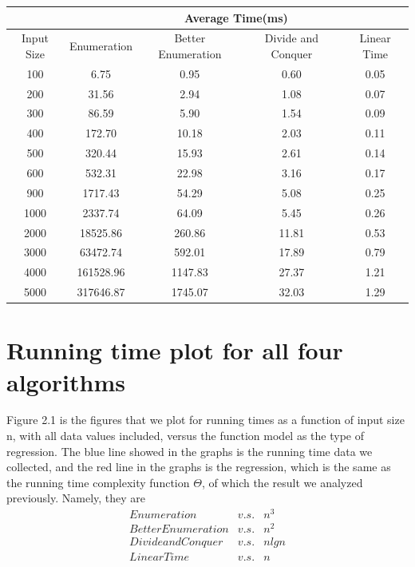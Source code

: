 \documentclass[11pt]{scrreprt}
\begin{document}
\begin{tabular}{|c|c|c|c|c|}
	\hline  & \multicolumn{4}{|c|}{Average Time(ms)} \\ 
	\hline Input Size & Enumeration & Better Enumeration & Divide and Conquer & Linear Time \\ 
	\hline  100 & 6.75 & 0.95 & 0.60 & 0.05 \\ 
	\hline  200 & 31.56 & 2.94 & 1.08 & 0.07 \\ 
	\hline  300 & 86.59 & 5.90 & 1.54 & 0.09 \\ 
	\hline  400 & 172.70 & 10.18 & 2.03 & 0.11 \\ 
	\hline  500 & 320.44 & 15.93 & 2.61 & 0.14 \\ 
	\hline  600 & 532.31 & 22.98 & 3.16 & 0.17 \\ 
	\hline  900 & 1717.43 & 54.29 & 5.08 & 0.25 \\ 
	\hline  1000 & 2337.74 & 64.09 & 5.45 & 0.26 \\ 
	\hline  2000 & 18525.86 & 260.86 & 11.81 & 0.53 \\ 
	\hline  3000 & 63472.74 & 592.01 & 17.89 & 0.79 \\ 
	\hline  4000 & 161528.96 & 1147.83 & 27.37 & 1.21 \\ 
	\hline  5000 & 317646.87 & 1745.07 & 32.03 & 1.29 \\
	\hline 
\end{tabular} 

\section {Running time plot for all four algorithms}

Figure 2.1 is the figures that we plot for running times as a function of input size n, with all data values included, versus the function model as the type of regression. The blue line showed in the graphs is the running time data we collected, and the red line in the graphs is the regression, which is the same as the running time complexity function $\Theta$, of which the result we analyzed previously. Namely, they are
\begin{eqnarray*}
Enumeration & v.s. & n^3\\
Better Enumeration & v.s. & n^2\\
Divide and Conquer & v.s. & nlgn\\
Linear Time & v.s. & n
\end{eqnarray*}
\end{document}
